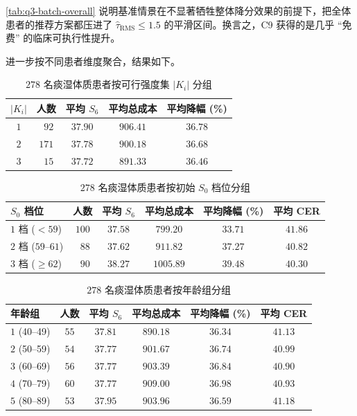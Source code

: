 \documentclass{MathorCupmodeling}
\begin{document}
\cref{tab:q3-batch-overall} 说明基准情景在不显著牺牲整体降分效果的前提下，把全体患者的推荐方案都压进了 $\widehat\tau_{\mathrm{RMS}}\le 1.5$ 的平滑区间。换言之，C9 获得的是几乎 ``免费'' 的临床可执行性提升。

进一步按不同患者维度聚合，结果如下。

\begin{table}[H]
\centering\small
\caption{$278$ 名痰湿体质患者按可行强度集 $|K_i|$ 分组}\label{tab:q3-by-K}
\begin{tabular}{@{}c c c c c@{}}
\toprule
$|K_i|$ & 人数 & 平均 $S_6$ & 平均总成本 & 平均降幅 (\%) \\
\midrule
$1$ & $\phantom{0}92$ & $37.90$ & $906.41$ & $36.78$ \\
$2$ & $171$ & $37.78$ & $900.18$ & $36.68$ \\
$3$ & $\phantom{0}15$ & $37.72$ & $891.33$ & $36.46$ \\
\bottomrule
\end{tabular}
\end{table}

\begin{table}[H]
\centering\small
\caption{$278$ 名痰湿体质患者按初始 $S_0$ 档位分组}\label{tab:q3-by-S0}
\begin{tabular}{@{}l c c c c c@{}}
\toprule
$S_0$ 档位 & 人数 & 平均 $S_6$ & 平均总成本 & 平均降幅 (\%) & 平均 CER \\
\midrule
$1$ 档 ($<59$) & $100$ & $37.58$ & $799.20$ & $33.71$ & $41.86$ \\
$2$ 档 ($59$--$61$) & $\phantom{0}88$ & $37.62$ & $911.82$ & $37.27$ & $40.82$ \\
$3$ 档 ($\ge 62$) & $\phantom{0}90$ & $38.27$ & $1005.89$ & $39.48$ & $40.30$ \\
\bottomrule
\end{tabular}
\end{table}

\begin{table}[H]
\centering\small
\caption{$278$ 名痰湿体质患者按年龄组分组}\label{tab:q3-by-age}
\begin{tabular}{@{}l c c c c c@{}}
\toprule
年龄组 & 人数 & 平均 $S_6$ & 平均总成本 & 平均降幅 (\%) & 平均 CER \\
\midrule
$1$ (40--49) & $55$ & $37.81$ & $890.18$ & $36.34$ & $41.13$ \\
$2$ (50--59) & $54$ & $37.77$ & $901.67$ & $36.74$ & $40.99$ \\
$3$ (60--69) & $56$ & $37.77$ & $903.39$ & $36.84$ & $40.90$ \\
$4$ (70--79) & $60$ & $37.77$ & $909.00$ & $36.98$ & $40.93$ \\
$5$ (80--89) & $53$ & $37.95$ & $903.96$ & $36.59$ & $41.18$ \\
\bottomrule
\end{tabular}
\end{table}
\end{document}

